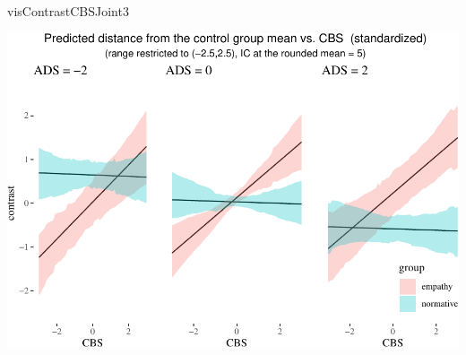 \documentclass[10pt,dvipsnames,enabledeprecatedfontcommands]{scrartcl}
\newenvironment{Shaded}{\begin{snugshade}}{\end{snugshade}}
\newcommand{\NormalTok}[1]{#1}
\begin{document}
\begin{Shaded}
\begin{Highlighting}[]
\NormalTok{visContrastCBSJoint3}
\end{Highlighting}
\end{Shaded}

\begin{center}\includegraphics[width=1\linewidth]{bayesianReport3_files/figure-latex/unnamed-chunk-13-1} \end{center}

\normalsize

\vspace{1mm} \footnotesize
\end{document}
